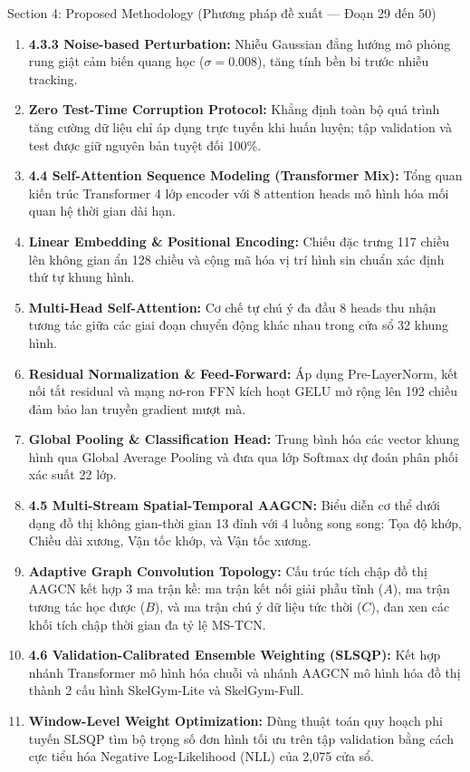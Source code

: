 \documentclass[10pt,a4paper]{article}
\begin{document}
\begin{secbox}{Section 4: Proposed Methodology (Phương pháp đề xuất — Đoạn 29 đến 50)}
\begin{enumerate}[leftmargin=*, itemsep=2pt, topsep=1pt, start=29]
    \item \textbf{4.3.3 Noise-based Perturbation:} Nhiễu Gaussian đẳng hướng mô phỏng rung giật cảm biến quang học ($\sigma=0.008$), tăng tính bền bỉ trước nhiễu tracking.
    \item \textbf{Zero Test-Time Corruption Protocol:} Khẳng định toàn bộ quá trình tăng cường dữ liệu chỉ áp dụng trực tuyến khi huấn luyện; tập validation và test được giữ nguyên bản tuyệt đối 100\%.
    \item \textbf{4.4 Self-Attention Sequence Modeling (Transformer Mix):} Tổng quan kiến trúc Transformer 4 lớp encoder với 8 attention heads mô hình hóa mối quan hệ thời gian dài hạn.
    \item \textbf{Linear Embedding \& Positional Encoding:} Chiếu đặc trưng 117 chiều lên không gian ẩn 128 chiều và cộng mã hóa vị trí hình sin chuẩn xác định thứ tự khung hình.
    \item \textbf{Multi-Head Self-Attention:} Cơ chế tự chú ý đa đầu 8 heads thu nhận tương tác giữa các giai đoạn chuyển động khác nhau trong cửa sổ 32 khung hình.
    \item \textbf{Residual Normalization \& Feed-Forward:} Áp dụng Pre-LayerNorm, kết nối tắt residual và mạng nơ-ron FFN kích hoạt GELU mở rộng lên 192 chiều đảm bảo lan truyền gradient mượt mà.
    \item \textbf{Global Pooling \& Classification Head:} Trung bình hóa các vector khung hình qua Global Average Pooling và đưa qua lớp Softmax dự đoán phân phối xác suất 22 lớp.
    \item \textbf{4.5 Multi-Stream Spatial-Temporal AAGCN:} Biểu diễn cơ thể dưới dạng đồ thị không gian-thời gian 13 đỉnh với 4 luồng song song: Tọa độ khớp, Chiều dài xương, Vận tốc khớp, và Vận tốc xương.
    \item \textbf{Adaptive Graph Convolution Topology:} Cấu trúc tích chập đồ thị AAGCN kết hợp 3 ma trận kề: ma trận kết nối giải phẫu tĩnh ($A$), ma trận tương tác học được ($B$), và ma trận chú ý dữ liệu tức thời ($C$), đan xen các khối tích chập thời gian đa tỷ lệ MS-TCN.
    \item \textbf{4.6 Validation-Calibrated Ensemble Weighting (SLSQP):} Kết hợp nhánh Transformer mô hình hóa chuỗi và nhánh AAGCN mô hình hóa đồ thị thành 2 cấu hình SkelGym-Lite và SkelGym-Full.
    \item \textbf{Window-Level Weight Optimization:} Dùng thuật toán quy hoạch phi tuyến SLSQP tìm bộ trọng số đơn hình tối ưu trên tập validation bằng cách cực tiểu hóa Negative Log-Likelihood (NLL) của 2,075 cửa sổ.

\end{enumerate}
\end{secbox}
\end{document}
